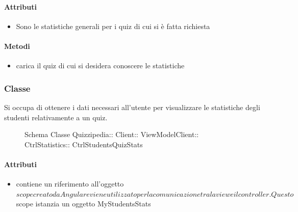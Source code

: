\paragraph{Attributi}
\begin{itemize}
\item {}
\newline
Sono le statistiche generali per i quiz di cui si è fatta richiesta
\end{itemize}
\paragraph{Metodi}
\begin{itemize}
\item {}
\newline
carica il quiz di cui si desidera conoscere le statistiche
\newline
\end{itemize}
\subsubsection{Classe }
Si occupa di ottenere i dati necessari all'utente per visualizzare le statistiche degli studenti relativamente a un quiz.
\begin{figure}[H]
\centering
\noindent{}
\caption[Schema Classe CtrlStudentsQuizStats]{Schema Classe Quizzipedia:: Client:: ViewModelClient:: CtrlStatistics:: CtrlStudentsQuizStats}
\end{figure}
\paragraph{Attributi}
\begin{itemize}
\item {}
\newline
contiene un riferimento all'oggetto $scope creato da Angular e viene utilizzato per la comunicazione tra la view e il controller. Questo $scope istanzia un oggetto MyStudentsStats
\end{itemize}
